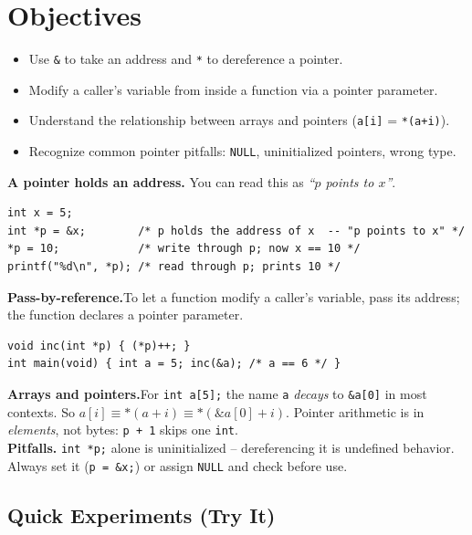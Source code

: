 \documentclass[11pt]{article}
\begin{document}
\labheader

\section*{Objectives}
\begin{itemize}[leftmargin=*,nosep]
  \item Use \texttt{\&} to take an address and \texttt{*} to dereference a pointer.
  \item Modify a caller's variable from inside a function via a pointer parameter.
  \item Understand the relationship between arrays and pointers (\texttt{a[i]} = \texttt{*(a+i)}).
  \item Recognize common pointer pitfalls: \texttt{NULL}, uninitialized pointers, wrong type.
\end{itemize}

\begin{summary}
\textbf{A pointer holds an address.} You can read this as \emph{``$p$ points to $x$''}.

\begin{lstlisting}
int x = 5;
int *p = &x;        /* p holds the address of x  -- "p points to x" */
*p = 10;            /* write through p; now x == 10 */
printf("%d\n", *p); /* read through p; prints 10 */
\end{lstlisting}

\textbf{Pass-by-reference.}\quad To let a function modify a caller's variable, pass its
address; the function declares a pointer parameter.
\begin{lstlisting}
void inc(int *p) { (*p)++; }
int main(void) { int a = 5; inc(&a); /* a == 6 */ }
\end{lstlisting}

\textbf{Arrays and pointers.}\quad For \texttt{int a[5];} the name \texttt{a} \emph{decays}
to \texttt{\&a[0]} in most contexts. So
\(a[i] \equiv *(a + i) \equiv *(\&a[0] + i)\). Pointer arithmetic is in \emph{elements},
not bytes: \texttt{p + 1} skips one \texttt{int}.\\

\textbf{Pitfalls.}\quad
\texttt{int *p;} alone is uninitialized -- dereferencing it is undefined behavior.
Always set it (\texttt{p = \&x;}) or assign \texttt{NULL} and check before use.
\end{summary}

\subsection*{Quick Experiments (Try It)}
\end{document}
